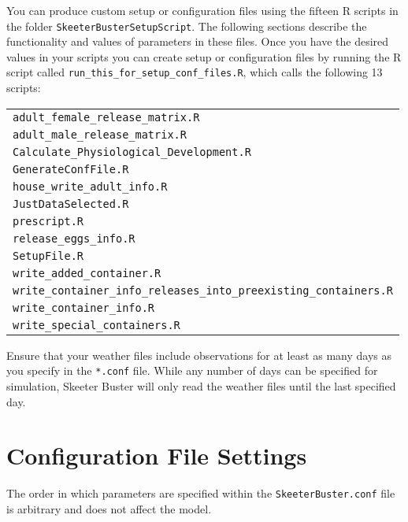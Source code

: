 \documentclass[11pt]{article}
\newcommand{\linecmd}[1]{\texttt{#1}}
\begin{document}
You can produce custom setup or configuration files using the fifteen R scripts in the folder \linecmd{SkeeterBusterSetupScript}. The following sections describe the functionality and values of parameters in these files. Once you have the desired values in your scripts you can create setup or configuration files by running the R script called \linecmd{run\_this\_for\_setup\_conf\_files.R}, which calls the following 13 scripts: \label{Rsetup}

\begin{table}[ht]
\begin{center}
\begin{tabular}{l}

\linecmd{adult\_female\_release\_matrix.R} \\
\linecmd{adult\_male\_release\_matrix.R} \\
\linecmd{Calculate\_Physiological\_Development.R} \\
\linecmd{GenerateConfFile.R} \\
\linecmd{house\_write\_adult\_info.R} \\
\linecmd{JustDataSelected.R} \\
\linecmd{prescript.R} \\
\linecmd{release\_eggs\_info.R} \\
\linecmd{SetupFile.R} \\
\linecmd{write\_added\_container.R} \\
\linecmd{write\_container\_info\_releases\_into\_preexisting\_containers.R} \\
\linecmd{write\_container\_info.R} \\
\linecmd{write\_special\_containers.R} \\
	 
\end{tabular}
\end{center}
\label{default}
\end{table}

Ensure that your weather files include observations for at least as many days as you specify in the \linecmd{*.conf} file. While any number of days can be specified for simulation, Skeeter Buster will only read the weather files until the last specified day.

\section{Configuration File Settings}

The order in which parameters are specified within the \linecmd{SkeeterBuster.conf} file is arbitrary and does not affect the model.
\end{document}
